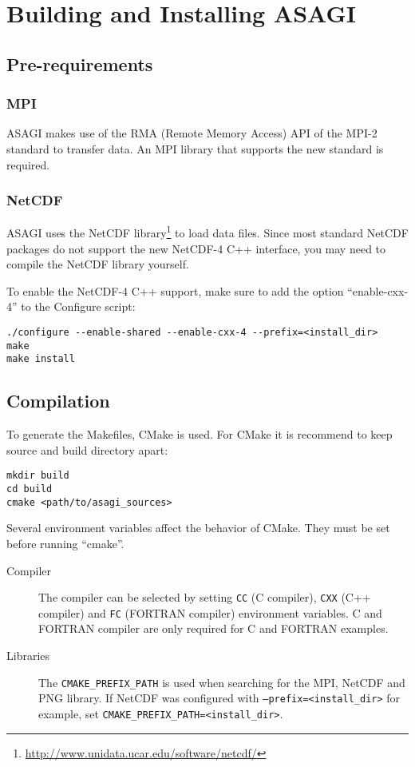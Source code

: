 \section{Building and Installing ASAGI}

\subsection{Pre-requirements}

\subsubsection{MPI}

ASAGI makes use of the RMA (Remote Memory Access) API of the MPI-2 standard to transfer data. An MPI library that supports the new standard is required.

\subsubsection{NetCDF}

ASAGI uses the NetCDF library\footnote{\url{http://www.unidata.ucar.edu/software/netcdf/}} to load data files. Since most standard NetCDF packages do not support the new NetCDF-4 C++ interface, you may need to compile the NetCDF library yourself.

To enable the NetCDF-4 C++ support, make sure to add the option ``enable-cxx-4'' to the Configure script:

\lstset{language=bash}
\begin{lstlisting}
./configure --enable-shared --enable-cxx-4 --prefix=<install_dir>
make
make install
\end{lstlisting}

\subsection{Compilation}

To generate the Makefiles, CMake is used. For CMake it is recommend to keep source and build directory apart:

\lstset{language=bash}
\begin{lstlisting}
mkdir build
cd build
cmake <path/to/asagi_sources>
\end{lstlisting}

Several environment variables affect the behavior of CMake. They must be set before running ``cmake''.

\begin{description}
 \item[Compiler] The compiler can be selected by setting \texttt{CC} (C compiler), \texttt{CXX} (C++ compiler) and \texttt{FC} (FORTRAN compiler) environment variables. C and FORTRAN compiler are only required for C and FORTRAN examples.
 \item[Libraries] The \texttt{CMAKE\_PREFIX\_PATH} is used when searching for the MPI, Net\-CDF and PNG library. If NetCDF was configured with \texttt{--prefix=<in\-stall\_dir>} for example, set \texttt{CMAKE\_PREFIX\_PATH=<install\_dir>}.
\end{description}

